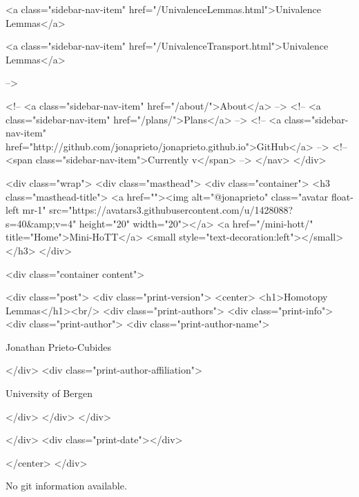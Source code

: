       
    
      
        
          <a class="sidebar-nav-item" href="/UnivalenceLemmas.html">Univalence Lemmas</a>
        
      
    
      
        
          <a class="sidebar-nav-item" href="/UnivalenceTransport.html">Univalence Lemmas</a>
        
      
     -->

    <!-- <a class="sidebar-nav-item" href="/about/">About</a> -->
    <!-- <a class="sidebar-nav-item" href="/plans/">Plans</a> -->
    <!-- <a class="sidebar-nav-item" href="http://github.com/jonaprieto/jonaprieto.github.io">GitHub</a> -->
    <!-- <span class="sidebar-nav-item">Currently v</span> -->
  </nav>
</div>

    <div class="wrap">
      <div class="masthead">
        <div class="container">
          <h3 class="masthead-title">
            <a href=""><img alt="@jonaprieto" class="avatar float-left mr-1" src="https://avatars3.githubusercontent.com/u/1428088?s=40&amp;v=4" height="20" width="20"></a>
            <a href="/mini-hott/" title="Home">Mini-HoTT</a>
            <small style="text-decoration:left"></small>
          </h3>
        </div>
      
      <div class="container content">
        







<div class="post">
  <div class="print-version">
    <center>
      <h1>Homotopy Lemmas</h1><br/>
        <div class="print-authors">
          <div class="print-info">
            <div class="print-author">
              <div class="print-author-name">
                
                  Jonathan Prieto-Cubides
                
              </div>
              <div class="print-author-affiliation">
                
                  University of Bergen
                
                </div>
            </div>
          </div>
          
          
        </div>
        <div class="print-date"></div>
        
        
    </center>
  </div>

  
  No git information available.
  

